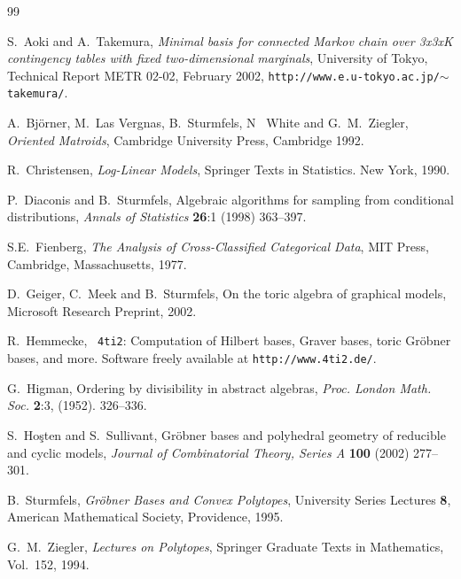 \documentclass[11pt]{amsart}
\theoremstyle{definition}
\begin{document}
\bigskip

\begin{thebibliography}{99}

   {\rm S.~Aoki and A.~Takemura}, {\em
Minimal basis for connected Markov chain over
3x3xK contingency tables with fixed two-dimensional marginals},
University of Tokyo, Technical Report METR 02-02, February 2002,
{\tt http://www.e.u-tokyo.ac.jp/$\sim$takemura/}.


   {\rm A.~Bj\"orner, M.~Las Vergnas, B.~Sturmfels, N~  
White
  and G.~M.~Ziegler}, {\em Oriented Matroids}, Cambridge University  
Press,
  Cambridge 1992.

 {\rm R.~Christensen},  {\em Log-Linear Models},
Springer Texts in Statistics.  New York, 1990.

    {\rm P.~Diaconis and B.~Sturmfels},
Algebraic algorithms for sampling from conditional distributions,
{\em Annals of Statistics} {\bf 26}:1 (1998) 363--397.

 {\rm S.E.~Fienberg},
{\em The Analysis of Cross-Classified Categorical Data},
MIT Press, Cambridge, Massachusetts, 1977.

 {\rm D.~Geiger,  C.~Meek and B.~Sturmfels},
On the toric algebra of graphical models,
Microsoft Research Preprint, 2002.

 {\rm R.~Hemmecke}, \ {\tt 4ti2}:
Computation of Hilbert bases, Graver bases, toric Gröbner bases, and more.
Software freely available at {\tt http://www.4ti2.de/}.

 {\rm G.~Higman},
  Ordering by divisibility in abstract algebras,
{\em Proc. London Math. Soc.} {\bf 2}:3, (1952). 326--336.

 S.~Ho\c{s}ten and S.~Sullivant,
  Gr\"obner bases and polyhedral geometry of reducible and cyclic models,
{\em Journal of Combinatorial Theory, Series A} {\bf 100}
(2002) 277--301.

   {\rm B.~Sturmfels}, {\em Gr\"obner Bases and  
Convex
  Polytopes},  University Series Lectures {\bf 8}, American Mathematical
  Society, Providence, 1995.

   {\rm G.~M.~Ziegler}, {\em Lectures on Polytopes},
  Springer Graduate Texts in Mathematics, Vol.~152, 1994.

  \end{thebibliography}
  
\end{document}
